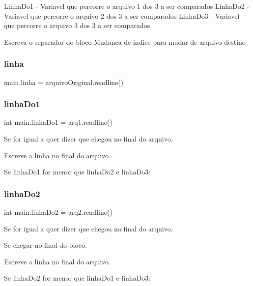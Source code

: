 Linha\+Do1 -\/ Variavel que percorre o arquivo 1 dos 3 a ser comparados Linha\+Do2 -\/ Variavel que percorre o arquivo 2 dos 3 a ser comparados Linha\+Do3 -\/ Variavel que percorre o arquivo 3 dos 3 a ser comparados

Escreva o separador do bloco Mudanca de indice para mudar de arquivo destino \mbox{\label{namespacemain_aa9194e3c86ce7146cfba8baf710894b8}} 
\subsubsection{\texorpdfstring{linha}{linha}}
{\footnotesize\ttfamily main.\+linha = arquivo\+Original.\+readline()}

\mbox{\label{namespacemain_acd60c1e49534829a55f6a2658e323846}} 
\subsubsection{\texorpdfstring{linha\+Do1}{linhaDo1}}
{\footnotesize\ttfamily int main.\+linha\+Do1 = arq1.\+readline()}



Se for igual a \textquotesingle{}\textquotesingle{} quer dizer que chegou no final do arquivo. 

Escreve a linha no final do arquivo.

Se linha\+Do1 for menor que linha\+Do2 e linha\+Do3\+: \mbox{\label{namespacemain_a614c35d15ed676c2cd0f2bf8071766cf}} 
\subsubsection{\texorpdfstring{linha\+Do2}{linhaDo2}}
{\footnotesize\ttfamily int main.\+linha\+Do2 = arq2.\+readline()}



Se for igual a \textquotesingle{}\textquotesingle{} quer dizer que chegou no final do arquivo. 

Se chegar no final do bloco.

Escreve a linha no final do arquivo.

Se linha\+Do2 for menor que linha\+Do1 e linha\+Do3\+: \mbox{\label{namespacemain_a6a808f2c72f7691e1ceccd6c979ed50e}} 
